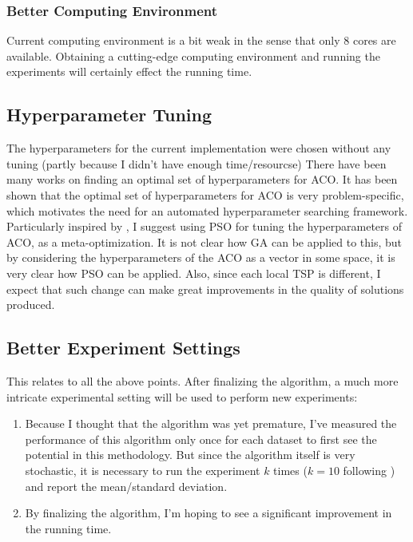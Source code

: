 \documentclass[a4paper]{article}
\begin{document}
{\subsubsection{Better Computing Environment}
Current computing environment is a bit weak in the sense that only $8$ cores are available.
Obtaining a cutting-edge computing environment and running the experiments will certainly effect the running time.


\subsection{Hyperparameter Tuning}
\label{subsec:hyper}
The hyperparameters for the current implementation were chosen without any tuning (partly because I didn't have enough time/resourcse)
There have been many works on finding an optimal set of hyperparameters for ACO\cite{GC05, DHY10, MBK15}.
It has been shown that the optimal set of hyperparameters for ACO is very problem-specific, which motivates the need for an automated hyperparameter searching framework.
Particularly inspired by \cite{MBK15}, I suggest using PSO for tuning the hyperparameters of ACO, as a meta-optimization.
It is not clear how GA can be applied to this, but by considering the hyperparameters of the ACO as a vector in some space, it is very clear how PSO can be applied.
Also, since each local TSP is different, I expect that such change can make great improvements in the quality of solutions produced.


\subsection{Better Experiment Settings}
\label{subsec:better-exp}
This relates to all the above points.
After finalizing the algorithm, a much more intricate experimental setting will be used to perform new experiments:
\begin{enumerate}
	\item Because I thought that the algorithm was yet premature, I've measured the performance of this algorithm only once for each dataset to first see the potential in this methodology.
	But since the algorithm itself is very stochastic, it is necessary to run the experiment $k$ times ($k=10$ following \cite{MBK15}) and report the mean/standard deviation.
	
	\item By finalizing the algorithm, I'm hoping to see a significant improvement in the running time.
\end{enumerate}


}
\end{document}
